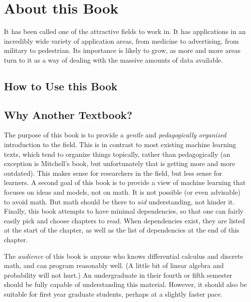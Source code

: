 
\chapter{About this Book} \label{sec:intro}

  It
has been called one of the attractive fields to work in\cite{}.  It has
applications in an incredibly wide variety of application areas, from
medicine to advertising, from military to pedestrian.  Its importance
is likely to grow, as more and more areas turn to it as a way of
dealing with the massive amounts of data available.

\section{How to Use this Book}


\section{Why Another Textbook?}

The purpose of this book is to provide a \emph{gentle} and
\emph{pedagogically organized} introduction to the field.  This is in
contrast to most existing machine learning texts, which tend to
organize things topically, rather than pedagogically (an exception is
Mitchell's book, but unfortunately that is
getting more and more outdated).  This makes sense for researchers in
the field, but less sense for learners.  A second goal of this book is
to provide a view of machine learning that focuses on ideas and
models, not on math.  It is not possible (or even advisable) to avoid
math.  But math should be there to \emph{aid} understanding, not
hinder it.  Finally, this book attempts to have minimal dependencies,
so that one can fairly easily pick and choose chapters to read.  When
dependencies exist, they are listed at the start of the chapter, as
well as the list of dependencies at the end of this chapter.

The \emph{audience} of this book is anyone who knows differential
calculus and discrete math, and can program reasonably well.  (A
little bit of linear algebra and probability will not hurt.)  An
undergraduate in their fourth or fifth semester should be fully
capable of understanding this material.  However, it should also be
suitable for first year graduate students, perhaps at a slightly
faster pace.

